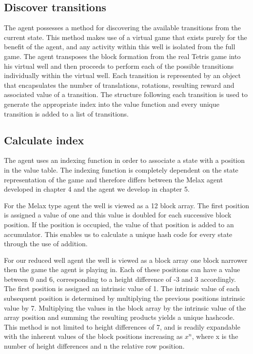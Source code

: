 \documentclass{rucsthesis}
\begin{document}
\subsection{Discover transitions}

The agent possesses a method for discovering the available transitions from the current state. This method makes use of a virtual game that exists purely for the benefit of the agent, and any activity within this well is isolated from the full game. The agent transposes the block formation from the real Tetris game into his virtual well and then proceeds to perform each of the possible transitions individually within the virtual well. Each transition is represented by an object that encapsulates the number of translations, rotations, resulting reward and associated value of a transition. The structure following each transition is used to generate the appropriate index into the value function and every unique transition is added to a list of transitions.

\subsection{Calculate index}

The agent uses an indexing function in order to associate a state with a position in the value table. The indexing function is completely dependent on the state representation of the game and therefore differs between the Melax agent developed in chapter 4 and the agent we develop in chapter 5.

For the Melax type agent the well is viewed as a 12 block array. The first position is assigned a value of one and this value is doubled for each successive block position. If the position is occupied, the value of that position is added to an accumulator. This enables us to calculate a unique hash code for every state through the use of addition.

For our reduced well agent the well is viewed as a block array one block narrower then the game the agent is playing in. Each of these positions can have a value between 0 and 6, corresponding to a height difference of -3 and 3 accordingly. The first position is assigned an intrinsic value of 1. The intrinsic value of each subsequent position is determined by multiplying the previous positions intrinsic value by 7. Multiplying the values in the block array by the intrinsic value of the array position and summing the resulting products yields a unique hashcode. This method is not limited to height differences of 7, and is readily expandable with the inherent values of the block positions increasing as $x^n$, where x is the number of height differences and n the relative row position.
\end{document}
